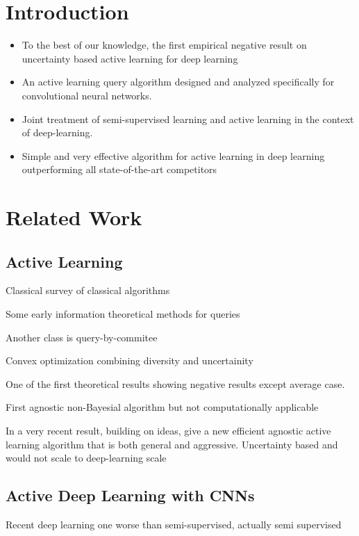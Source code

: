 \documentclass{article}
\begin{document}
\section{Introduction}
\begin{itemize}
\item To the best of our knowledge, the first empirical negative result on uncertainty based active learning for deep learning
\item An active learning query algorithm designed and analyzed specifically for convolutional neural networks.
\item Joint treatment of semi-supervised learning and active learning in the context of deep-learning. 
\item Simple and very effective algorithm for active learning in deep learning outperforming all state-of-the-art competitors
\end{itemize}

\section{Related Work}

\subsection{Active Learning}
Classical survey of classical algorithms \cite{settles2010active}

Some early information theoretical methods for queries \cite{mackay1992information}

Another class is query-by-commitee \cite{mccallumzy1998employing, freund1997selective}

Convex optimization combining diversity and uncertainity \cite{elhamifar2013convex}



 One of the first theoretical results \cite{dasgupta2004analysis} showing negative results except average case.

 First agnostic non-Bayesial algorithm but not computationally applicable \cite{balcan2009agnostic}

In a very recent result, \cite{huang2015efficient} building on ideas, give a new efficient agnostic active learning algorithm that is both general and aggressive. Uncertainty based and would not scale to deep-learning scale

\subsection{Active Deep Learning with CNNs}
Recent deep learning one \cite{wang2016cost} worse than semi-supervised, actually semi supervised
\end{document}
